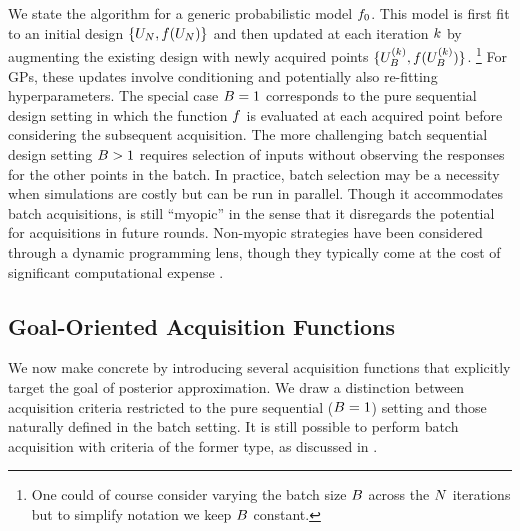 \documentclass[12pt]{article}
\begin{document}
We state the algorithm for a generic probabilistic model $\funcPrior$. 
This model is first fit to an initial design $\{\designIn[\Ndesign], \func(\designIn[\Ndesign])\}$ and then 
updated at each iteration $\designIndex$ by augmenting the existing design with newly 
acquired points $\{\designBatchIn^{(\designIndex)}, \func(\designBatchIn^{(\designIndex)})\}$.
\footnote{One could of course consider varying the batch size $\Nbatch$ across the $\Ndesign$ iterations but to simplify notation
we keep $\Nbatch$ constant.}
For GPs, these updates involve conditioning and potentially also re-fitting hyperparameters. 
The special case $\Nbatch = 1$ corresponds to the 
pure sequential design setting in which the function $\func$ is evaluated at each acquired point before
considering the subsequent acquisition. The more challenging batch sequential design setting
$\Nbatch > 1$ requires selection of inputs without observing the responses for the other points
in the batch. In practice, batch selection may be a necessity when simulations are costly but can 
be run in parallel. Though it accommodates batch acquisitions,  is
still ``myopic'' in the sense that it disregards the potential for acquisitions in future rounds. 
Non-myopic strategies have been considered
through a dynamic programming lens, though they typically come at the cost of significant 
computational expense \citep{SURThesis, supermartingaleSUR}.

\subsection{Goal-Oriented Acquisition Functions}
We now make  concrete by introducing several acquisition functions
that explicitly target the goal of posterior approximation. We draw a distinction between 
acquisition criteria restricted to the pure sequential ($\Nbatch = 1$) setting
and those naturally defined in the batch setting. It is still possible to perform 
batch acquisition with criteria of the former type, as discussed in .
\end{document}
